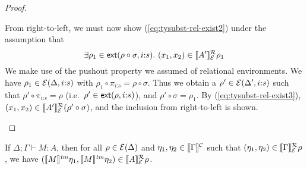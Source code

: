 \begin{proof}
\begin{enumerate}
\begin{description}
      From right-to-left, we must now show
      (\ref{eq:tysubst-rel-exist2}) under the assumption that
      \begin{equation}
        \label{eq:tysubst-rel-exist3}
        \exists \rho_1 \in \extends{\rho \circ \sigma}{i\mathord:s}.\ (x_1,x_2) \in \rsem{A'}{\relEnv{E}}{\rho_1}
      \end{equation}
      We make use of the pushout property we assumed of relational
      environments.  We have $\rho_1 \in \mathcal{E}(\Delta,
      i\mathord:s)$ with $\rho_1 \circ \pi_{i\mathord:s} = \rho \circ
      \sigma$. Thus we obtain a $\rho' \in
      \mathcal{E}(\Delta',i\mathord:s)$ such that $\rho' \circ
      \pi_{i\mathord:s} = \rho$ (i.e.~$\rho' \in
      \mathsf{ext}(\rho,i\mathord:s)$), and $\rho' \circ \sigma =
      \rho_1$. By (\ref{eq:tysubst-rel-exist3}), $(x_1,x_2) \in
      \llbracket A' \rrbracket^{\mathcal{R}}_{\mathcal{E}}{(\rho' \circ \sigma)}$, and the inclusion
      from right-to-left is shown.
    \end{description}
  \end{enumerate}
\end{proof}

\begin{restateTheorem}
  If $\Delta; \Gamma \vdash M : A$, then for all $\rho \in
  \mathcal{E}(\Delta)$ and $\eta_1, \eta_2 \in \llbracket \Gamma \rrbracket^{\mathcal{C}}$ such
  that $(\eta_1, \eta_2) \in \llbracket \Gamma \rrbracket^{\mathcal{R}}_{\mathcal{E}}{\rho}$, we have
  $(\llbracket M \rrbracket^{\mathit{tm}}\eta_1, \llbracket M \rrbracket^{\mathit{tm}}\eta_2) \in \llbracket A \rrbracket^{\mathcal{R}}_{\mathcal{E}}{\rho}$.
\end{restateTheorem}

